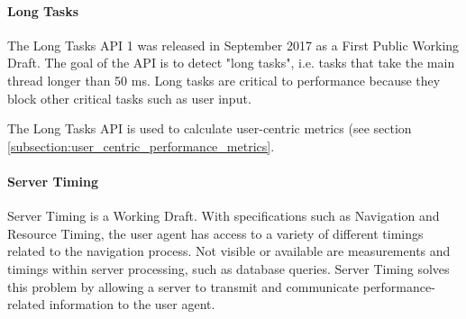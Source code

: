 	






\paragraph{Long Tasks} %

The Long Tasks API 1 was released in September 2017 as a First Public Working Draft.
The goal of the API is to detect "long tasks", i.e. tasks that take the main thread longer than 50 ms.
Long tasks are critical to performance because they block other critical tasks such as user input. %

The Long Tasks API is used to calculate user-centric metrics (see section \ref{subsection:user_centric_performance_metrics}.






\paragraph{Server Timing} %

Server Timing is a Working Draft.
With specifications such as Navigation and Resource Timing, the user agent has access to a variety of different timings related to the navigation process.
Not visible or available are measurements and timings within server processing, such as database queries.
Server Timing solves this problem by allowing a server to transmit and communicate performance-related information to the user agent. %

